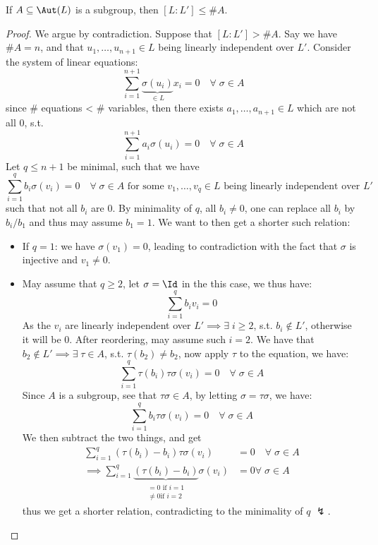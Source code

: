 \begin{proposition}
	\label{prop:upperbound-automorphisms}
	If \( A \subseteq \Aut(L) \) is a subgroup, then \( [L:L'] \leq \# A \).
\end{proposition}

\begin{proof}
	We argue by contradiction. Suppose that \( [L:L'] > \# A \). Say we have \( \# A = n \), and that
	\( u_1,\ldots, u_{n+1} \in L \) being linearly independent over \( L' \). Consider the system of
	linear equations:
	\[
		\sum_{i=1}^{n+1} \underbrace{\sigma(u_i)}_{\in L}  x_i = 0 \quad \forall \; \sigma \in A
	\]
	since \# equations < \# variables, then there exists \( a_1,\ldots, a_{n+1} \in L \) which are not
	all \( 0 \), s.t.
	\[
		\sum_{i=1}^{n+1} a_i \sigma (u_i) = 0 \quad \forall \; \sigma  \in A
	\]
	Let \( q \leq n+1 \) be minimal, such that we have
	\[
		\sum_{i=1}^q b_i \sigma (v_i) = 0 \quad \forall \; \sigma \in A \text{ for some } v_1,\ldots,
		v_q \in L \text{ being linearly independent over } L'
	\]
	such that not all \( b_i \) are \( 0 \). By minimality of \( q \), all \( b_i \ne 0 \), one can
	replace all \( b_i \) by \( b_i / b_1 \) and thus may assume \( b_1 = 1 \). We want to then get a
	shorter such relation:
	\begin{itemize}
		\item If \( q = 1 \): we have \( \sigma(v_1) = 0 \), leading to contradiction with the fact that
		      \( \sigma \) is injective and \( v_1 \ne 0 \).
		\item May assume that \( q \geq 2 \), let \( \sigma = \Id \) in the this case, we thus have:
		      \[
			      \sum_{i=1}^q b_i v_i = 0
		      \]
		      As the \( v_i \) are linearly independent over \( L' \implies \exists \; i \geq 2 \), s.t.
		      \( b_i \not\in L' \), otherwise it will be \( 0 \). After reordering, may assume such \( i = 2 \). We
		      have that \( b_2 \not\in L' \implies \exists \; \tau \in A \), s.t. \( \tau (b_2) \ne b_2 \), now apply
		      \( \tau \) to the equation, we have:
		      \[
			      \sum_{i=1}^q \tau(b_i) \tau \sigma (v_i) = 0 \quad \forall \; \sigma \in A
		      \]
		      Since \( A \) is a subgroup, see that \( \tau \sigma \in A \), by letting \( \sigma = \tau
		      \sigma\), we have:
		      \[
			      \sum_{i=1}^q b_i \tau \sigma (v_i) = 0 \quad \forall \; \sigma \in A
		      \]
		      We then subtract the two things, and get
		      \[
			      \begin{aligned}
				      \sum_{i=1}^q (\tau (b_i) - b_i) \tau \sigma (v_i) & = 0 \quad \forall \; \sigma  \in A
				      \\
				      \implies \sum_{i=1}^q \underbrace{(\tau (b_i) - b_i)}_{\substack{=0 \text{ if } i = 1  \\ \ne 0 \text{
				      if } i = 2}} \sigma (v_i)                         & = 0 \forall \; \sigma \in A
			      \end{aligned}
		      \]
		      thus we get a shorter relation, contradicting to the minimality of \( q \) \( \lightning \).
	\end{itemize}
\end{proof}

